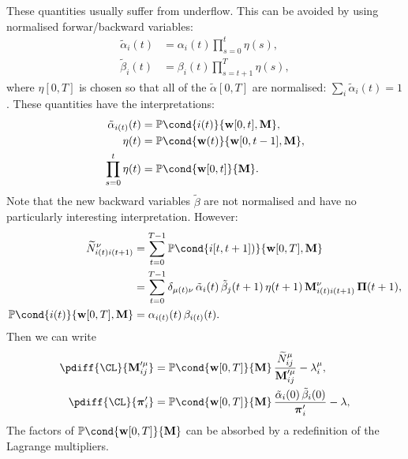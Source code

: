 \documentclass[12pt]{article}
\newcommand{\pib}{\boldsymbol{\pi}}
\newcommand{\Pib}{\boldsymbol{\Pi}}
\newcommand{\w}{\mathbf{w}}
\newcommand{\M}{\mathbf{M}}
\newcommand{\pr}{\mathbb{P}}
\begin{document}
These quantities usually suffer from underflow.
This can be avoided by using normalised forwar/backward variables:
%
\begin{equation}\label{eq:normalphabeta}
\begin{aligned}
  \tilde{\alpha}_i(t) &= \alpha_i(t) \prod_{s=0}^{t} \eta(s), \\
  \tilde{\beta}_i(t) &= \beta_i(t) \prod_{s=t+1}^{T} \eta(s),
\end{aligned}
\end{equation}
%
where $\eta[0,T]$ is chosen so that all of the $\tilde{\alpha}[0,T]$ are normalised: $\sum_i \tilde{\alpha}_i(t) = 1$.
These quantities have the interpretations:
%
\begin{equation}\label{eq:normintepr}
\begin{aligned}
  \tilde{\alpha}_{i(t)}(t) &= \pr\cond{i(t)}{\w[0,t],\M}, \\
  \eta(t) &= \pr\cond{\w(t)}{\w[0,t-1],\M}, \\
  \prod_{s=0}^t \eta(t) &= \pr\cond{\w[0,t]}{\M}.
\end{aligned}
\end{equation}
%
Note that the new backward variables $\tilde{\beta}$ are not normalised and have no particularly interesting interpretation.
However:
%
\begin{equation}\label{eq:normstateprob}
\begin{aligned}
  \widetilde{N}^\nu_{i(t)i(t+1)} &= \sum_{t=0}^{T-1} \pr\cond{i[t,t+1])}{\w[0,T],\M} \\
     &= \sum_{t=0}^{T-1} \delta_{\mu(t)\nu} \, \tilde{\alpha}_i(t) \, \tilde{\beta}_j(t+1) \, \eta(t+1) \, \M^{\nu}_{i(t)i(t+1)} \, \Pib(t+1) ,\\
  \pr\cond{i(t)}{\w[0,T],\M} &= \alpha_{i(t)}(t) \, \beta_{i(t)}(t).
\end{aligned}
\end{equation}
%
Then we can write
%
\begin{equation}\label{eq:singlediffsnorm}
\begin{aligned}
  \pdiff{\CL}{\M'^\mu_{ij}} &= \pr\cond{\w[0,T]}{\M} \, \frac{ \widetilde{N}^\mu_{ij} }{ \M'^\mu_{ij} } - \lambda^\mu_{i}, \\
  \pdiff{\CL}{\pib'_{i}} &= \pr\cond{\w[0,T]}{\M} \, \frac{ \tilde{\alpha}_i(0) \, \tilde{\beta}_i(0) }{ \pib'_{i} } - \lambda,
\end{aligned}
\end{equation}
%
The factors of $\pr\cond{\w[0,T]}{\M}$ can be absorbed by a redefinition of the Lagrange multipliers.
\end{document}
